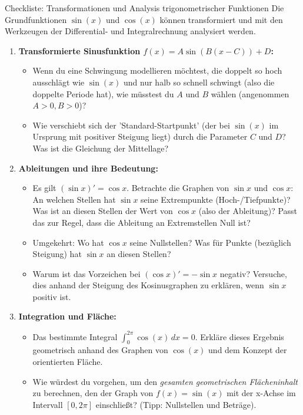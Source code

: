 \begin{aufgabenumgebung}{Checkliste: Transformationen und Analysis trigonometrischer Funktionen}
Die Grundfunktionen $\sin(x)$ und $\cos(x)$ können transformiert und mit den Werkzeugen der Differential- und Integralrechnung analysiert werden.

\begin{enumerate}[label=(\alph*)]
    \item \textbf{Transformierte Sinusfunktion $f(x) = A \sin(B(x-C)) + D$:}
    \begin{itemize}
        \item Wenn du eine Schwingung modellieren möchtest, die doppelt so hoch ausschlägt wie $\sin(x)$ und nur halb so schnell schwingt (also die doppelte Periode hat), wie müsstest du $A$ und $B$ wählen (angenommen $A>0, B>0$)?
        \item Wie verschiebt sich der 'Standard-Startpunkt' (der bei $\sin(x)$ im Ursprung mit positiver Steigung liegt) durch die Parameter $C$ und $D$? Was ist die Gleichung der Mittellage?
    \end{itemize}
    \item \textbf{Ableitungen und ihre Bedeutung:}
    \begin{itemize}
        \item Es gilt $(\sin x)' = \cos x$. Betrachte die Graphen von $\sin x$ und $\cos x$: An welchen Stellen hat $\sin x$ seine Extrempunkte (Hoch-/Tiefpunkte)? Was ist an diesen Stellen der Wert von $\cos x$ (also der Ableitung)? Passt das zur Regel, dass die Ableitung an Extremstellen Null ist?
        \item Umgekehrt: Wo hat $\cos x$ seine Nullstellen? Was für Punkte (bezüglich Steigung) hat $\sin x$ an diesen Stellen?
        \item Warum ist das Vorzeichen bei $(\cos x)' = -\sin x$ negativ? Versuche, dies anhand der Steigung des Kosinusgraphen zu erklären, wenn $\sin x$ positiv ist.
    \end{itemize}
    \item \textbf{Integration und Fläche:}
    \begin{itemize}
        \item Das bestimmte Integral $\int_0^{2\pi} \cos(x) \,dx = 0$. Erkläre dieses Ergebnis geometrisch anhand des Graphen von $\cos(x)$ und dem Konzept der orientierten Fläche.
        \item Wie würdest du vorgehen, um den \textit{gesamten geometrischen Flächeninhalt} zu berechnen, den der Graph von $f(x)=\sin(x)$ mit der x-Achse im Intervall $[0, 2\pi]$ einschließt? (Tipp: Nullstellen und Beträge).

\end{itemize}
\end{enumerate}
\end{aufgabenumgebung}
